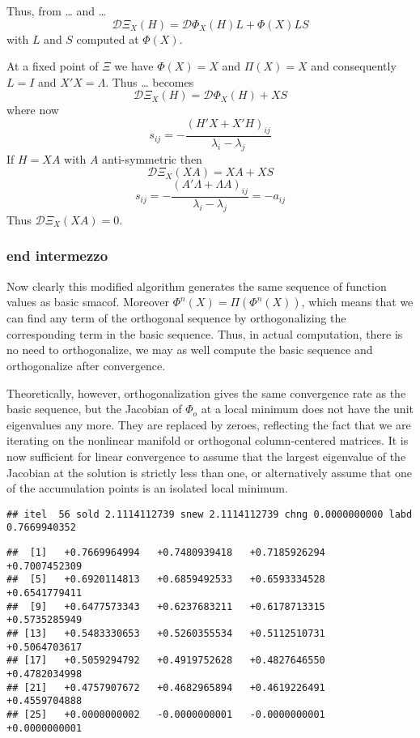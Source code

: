 \documentclass[
  12pt,
]{article}
\begin{document}
Thus, from \ldots{} and \ldots{}
\[
\mathcal{D}\Xi_X(H)=\mathcal{D}\Phi_X(H)L+\Phi(X)LS
\]
with \(L\) and \(S\) computed at \(\Phi(X)\).

At a fixed point of \(\Xi\) we have \(\Phi(X)=X\) and \(\Pi(X)=X\) and consequently
\(L=I\) and \(X'X=\Lambda\). Thus \ldots{} becomes
\[
\mathcal{D}\Xi_X(H)=\mathcal{D}\Phi_X(H)+XS
\]
where now
\[
s_{ij}=-\frac{(H'X+X'H)_{ij}}{\lambda_i-\lambda_j}
\]
If \(H=XA\) with \(A\) anti-symmetric then
\[
\mathcal{D}\Xi_X(XA)=XA+XS
\]
\[
s_{ij}=-\frac{(A'\Lambda+\Lambda A)_{ij}}{\lambda_i-\lambda_j}=-a_{ij}
\]
Thus \(\mathcal{D}\Xi_X(XA)=0\).

\subsubsection{end intermezzo}\label{end-intermezzo}

Now clearly this modified algorithm generates the same sequence of
function values as basic smacof. Moreover \(\Phi^n(X)=\Pi(\Phi^n(X))\),
which means that we can find any term of the orthogonal sequence
by orthogonalizing the corresponding term in the basic sequence.
Thus, in actual computation, there is no need to orthogonalize, we
may as well compute the basic sequence and orthogonalize after
convergence.

Theoretically, however, orthogonalization gives the same
convergence rate as the basic sequence, but the Jacobian
of \(\Phi_o\) at a local minimum does not have the unit
eigenvalues any more. They are replaced by zeroes, reflecting
the fact that we are iterating on the nonlinear manifold
or orthogonal column-centered matrices. It is now sufficient
for linear convergence to assume that the largest
eigenvalue of the Jacobian at the solution is strictly
less than one, or alternatively assume that one of the accumulation
points is an isolated local minimum.

\begin{verbatim}
## itel  56 sold 2.1114112739 snew 2.1114112739 chng 0.0000000000 labd 0.7669940352
\end{verbatim}

\begin{verbatim}
##  [1]   +0.7669964994   +0.7480939418   +0.7185926294   +0.7007452309
##  [5]   +0.6920114813   +0.6859492533   +0.6593334528   +0.6541779411
##  [9]   +0.6477573343   +0.6237683211   +0.6178713315   +0.5735285949
## [13]   +0.5483330653   +0.5260355534   +0.5112510731   +0.5064703617
## [17]   +0.5059294792   +0.4919752628   +0.4827646550   +0.4782034998
## [21]   +0.4757907672   +0.4682965894   +0.4619226491   +0.4559704888
## [25]   +0.0000000002   -0.0000000001   -0.0000000001   +0.0000000001
\end{verbatim}
\end{document}
